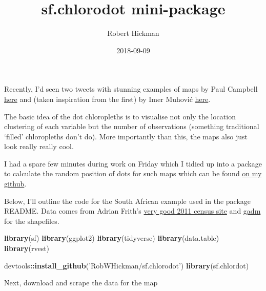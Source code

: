 \documentclass[]{article}
\title{sf.chlorodot mini-package}
\author{Robert Hickman}
\date{2018-09-09}
\newenvironment{Shaded}{\begin{snugshade}}{\end{snugshade}}
\newcommand{\KeywordTok}[1]{\textcolor[rgb]{0.13,0.29,0.53}{\textbf{#1}}}
\newcommand{\StringTok}[1]{\textcolor[rgb]{0.31,0.60,0.02}{#1}}
\newcommand{\OperatorTok}[1]{\textcolor[rgb]{0.81,0.36,0.00}{\textbf{#1}}}
\newcommand{\NormalTok}[1]{#1}
\begin{document}
\maketitle

Recently, I'd seen two tweets with stunning examples of maps by Paul
Campbell
\href{https://twitter.com/PaulCampbell91/status/992043182996193280}{here}
and (taken inspiration from the first) by Imer Muhović
\href{https://twitter.com/ImerM1/status/1037358973807210498}{here}.

The basic idea of the dot chloropleths is to visualise not only the
location clustering of each variable but the number of observations
(something traditional `filled' chloropleths don't do). More importantly
than this, the maps also just look really really cool.

I had a spare few minutes during work on Friday which I tidied up into a
package to calculate the random position of dots for such maps which can
be found \href{https://github.com/RobWHickman/sf.chlorodot}{on my
github}.

Below, I'll outline the code for the South African example used in the
package README. Data comes from Adrian Frith's
\href{https://census2011.adrianfrith.com/}{very good 2011 census site}
and \href{https://gadm.org/download_country_v3.html}{gadm} for the
shapefiles.

\begin{Shaded}
\begin{Highlighting}[]
\KeywordTok{library}\NormalTok{(sf)}
\KeywordTok{library}\NormalTok{(ggplot2)}
\KeywordTok{library}\NormalTok{(tidyverse)}
\KeywordTok{library}\NormalTok{(data.table)}
\KeywordTok{library}\NormalTok{(rvest)}

\NormalTok{devtools}\OperatorTok{::}\KeywordTok{install_github}\NormalTok{(}\StringTok{'RobWHickman/sf.chlorodot'}\NormalTok{)}
\KeywordTok{library}\NormalTok{(sf.chlordot)}
\end{Highlighting}
\end{Shaded}

Next, download and scrape the data for the map
\end{document}
